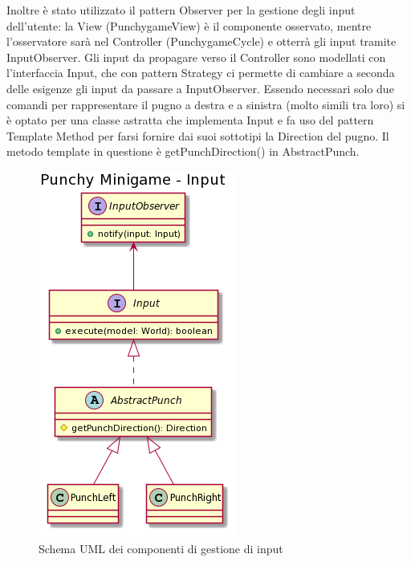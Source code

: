 \documentclass[a4paper,12pt]{report}
\begin{document}
	Inoltre è stato utilizzato il pattern Observer per la gestione degli input dell'utente: la View (PunchygameView) è il componente osservato, mentre l'osservatore sarà nel Controller (PunchygameCycle) e otterrà gli input tramite InputObserver.\newline
	Gli input da propagare verso il Controller sono modellati con l'interfaccia Input, che con pattern Strategy ci permette di cambiare a seconda delle esigenze gli input da passare a InputObserver.
    Essendo necessari solo due comandi per rappresentare il pugno a destra e a sinistra (molto simili tra loro) si è optato per una classe astratta che implementa Input e fa uso del pattern Template Method per farsi fornire dai suoi sottotipi la Direction del pugno.
	Il metodo template in questione è getPunchDirection() in AbstractPunch.
    \begin{figure}[h]
        \centering{}
        \includegraphics{images/picchiotti/punchyinput.png}
        \caption{Schema UML dei componenti di gestione di input}
        \label{img:punchyinput}
    \end{figure}
\end{document}
